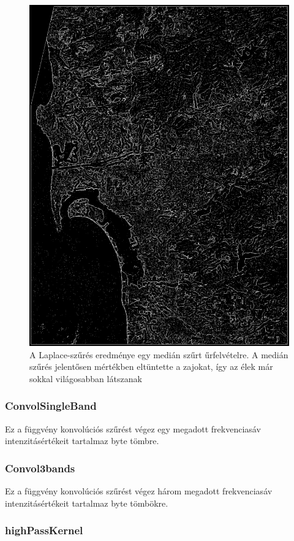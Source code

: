 \documentclass[a4paper,12pt]{article}
\begin{document}
\begin{figure}
	\centering
	\includegraphics[width=12cm]{laplace2.png}
	\caption{A Laplace-szűrés eredménye egy medián szűrt űrfelvételre. A medián szűrés jelentősen mértékben eltüntette a zajokat, így az élek már sokkal világosabban látszanak}
	\label{fig:laplace2}
\end{figure}

\subsubsection{ConvolSingleBand}

Ez a függvény konvolúciós szűrést végez egy megadott frekvenciasáv intenzitásértékeit tartalmaz byte tömbre.

\subsubsection{Convol3bands}

Ez a függvény konvolúciós szűrést végez három megadott frekvenciasáv intenzitásértékeit tartalmaz byte tömbökre.

\subsubsection{highPassKernel}
\end{document}
